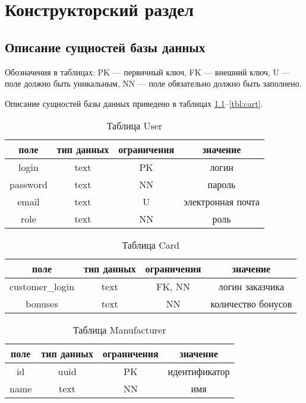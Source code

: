 \chapter{Конструкторский раздел}

\section{Описание сущностей базы данных}

Обозначения в таблицах: PK --- первичный ключ, FK --- внешний ключ, U --- поле должно быть уникальным, NN --- поле обязательно должно быть заполнено.

Описание сущностей базы данных приведено в таблицах \ref{tbl:user}--\ref{tbl:cart}.

\begin{table}[H]
	\begin{center}
		\caption{Таблица User}
		\label{tbl:user}
		\begin{tabular}{|c|c|c|c|}
			\hline
			поле & тип данных & ограничения & значение \\
			\hline
			login & text  & PK & логин \\
			\hline
			password & text & NN & пароль \\
			\hline
			email & text & U & электронная почта \\
			\hline
			role & text & NN & роль \\
			\hline
		\end{tabular}
	\end{center}	
\end{table}

\begin{table}[H]
	\begin{center}
		\caption{Таблица Card}
		\label{tbl:card}
		\begin{tabular}{|c|c|c|c|}
			\hline
			поле & тип данных & ограничения & значение \\
			\hline
			customer\_login & text & FK, NN & логин заказчика \\
			\hline
			bonuses & text & NN & количество бонусов \\
			\hline
		\end{tabular}
	\end{center}	
\end{table}

\begin{table}[H]
	\begin{center}
		\caption{Таблица Manufacturer}
		\label{tbl:man}
		\begin{tabular}{|c|c|c|c|}
			\hline
			поле & тип данных & ограничения & значение \\
			\hline
			id & uuid  & PK & идентификатор \\
			\hline
			name & text & NN & имя \\
			\hline
		\end{tabular}
	\end{center}	
\end{table}

